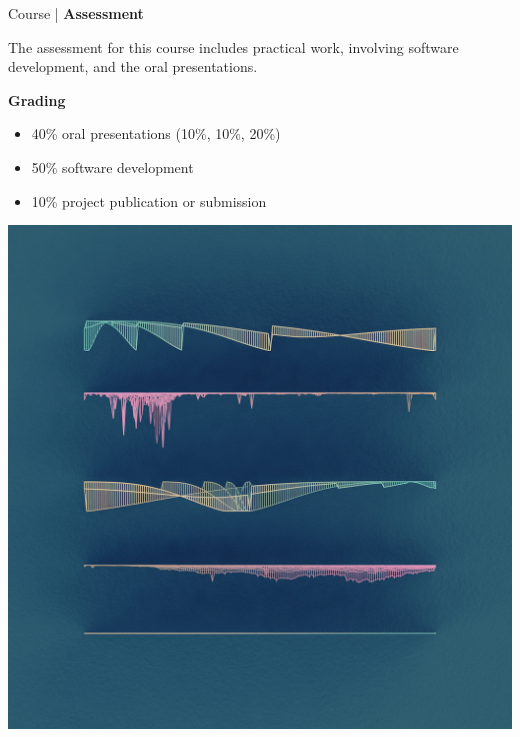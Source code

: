 \begin{frame}{Course | \textbf{Assessment}}

    \vfill
    {
        The assessment for this course includes practical work, involving software development, and the oral presentations.
        \bigskip
    
        \textbf{Grading}
        \begin{itemize}
            \item 40\% oral presentations (10\%, 10\%, 20\%)
            \item 50\% software development
            \item 10\% project publication or submission
        \end{itemize}
    }
    {
        \includegraphics[width=\textwidth]{images/scoring}   
    }
    \vfill

\end{frame}


